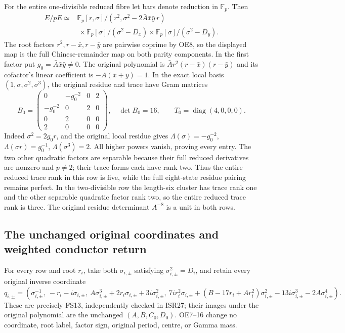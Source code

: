 For the entire one-divisible reduced fibre let bars denote
reduction in $\mathbb F_p$. Then
\begin{equation}
 \begin{aligned}
 E/pE\simeq{}&
 \mathbb F_p[r,\sigma]/(r^2,\sigma^2-2\bar A\bar x\bar y\,r)
 \\&\ \times\mathbb F_p[\sigma]/(\sigma^2-\bar D_x)
 \times\mathbb F_p[\sigma]/(\sigma^2-\bar D_y).
 \end{aligned}                                          \tag{OE15}
\end{equation}
The root factors $r^2,r-\bar x,r-\bar y$ are pairwise coprime
by OE8, so the displayed map is the full Chinese-remainder map
on both parity components. In the first factor put
$g_0=\bar A\bar x\bar y\ne0$. The original polynomial is
$\bar A r^2(r-\bar x)(r-\bar y)$ and its cofactor's linear
coefficient is $-\bar A(\bar x+\bar y)=1$. In the exact local
basis $(1,\sigma,\sigma^2,\sigma^3)$, the original residue and
trace have Gram matrices
\begin{equation}
 B_0=\begin{pmatrix}
 0&-g_0^{-2}&0&2\\-g_0^{-2}&0&2&0\\0&2&0&0\\2&0&0&0
 \end{pmatrix},\quad \det B_0=16,\qquad
 T_0=\operatorname{diag}(4,0,0,0).                     \tag{OE16}
\end{equation}
Indeed $\sigma^2=2g_0r$, and the original local residue gives
$\Lambda(\sigma)=-g_0^{-2}$, $\Lambda(\sigma r)=g_0^{-1}$,
$\Lambda(\sigma^3)=2$. All higher powers vanish, proving every
entry. The two other quadratic factors are separable because
their full reduced derivatives are nonzero and $p\ne2$; their
trace forms each have rank two. Thus the entire reduced trace
rank in this row is five, while the full eight-state residue
pairing remains perfect. In the two-divisible row the length-six
cluster has trace rank one and the other separable quadratic
factor rank two, so the entire reduced trace rank is three.
The original residue determinant $A^{-8}$ is a unit in both rows.

\subsection{The unchanged original coordinates and weighted conductor return}
For every row and root $r_i$, take both $\sigma_{i,\pm}$ satisfying
$\sigma_{i,\pm}^2=D_i$, and retain every original inverse coordinate
\begin{equation}
 q_{i,\pm}=\left(
 \sigma_{i,\pm}^{-1},\ -r_i-i\sigma_{i,\pm},\
 A\sigma_{i,\pm}^3+2r_i\sigma_{i,\pm}+3i\sigma_{i,\pm}^2,\
 7ir_i^2\sigma_{i,\pm}
 +(B-17r_i+Ar_i^2)\sigma_{i,\pm}^2
 -13i\sigma_{i,\pm}^3-2A\sigma_{i,\pm}^4\right).
                                                               \tag{OE17}
\end{equation}
These are precisely FS13, independently checked in ISR27; their
images under the original polynomial are the unchanged
$(A,B,C_0,D_0)$. OE7--16 change no coordinate, root label,
factor sign, original period, centre, or Gamma mass.


